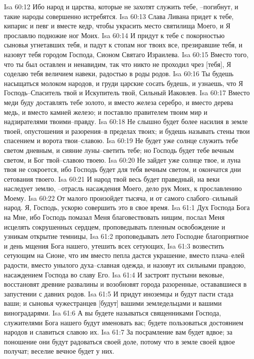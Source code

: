 Isa 60:12  Ибо народ и царства, которые не захотят служить тебе, --погибнут, и такие народы совершенно истребятся.
Isa 60:13  Слава Ливана придет к тебе, кипарис и певг и вместе кедр, чтобы украсить место святилища Моего, и Я прославлю подножие ног Моих.
Isa 60:14  И придут к тебе с покорностью сыновья угнетавших тебя, и падут к стопам ног твоих все, презиравшие тебя, и назовут тебя городом Господа, Сионом Святаго Израилева.
Isa 60:15  Вместо того, что ты был оставлен и ненавидим, так что никто не проходил чрез [тебя], Я соделаю тебя величием навеки, радостью в роды родов.
Isa 60:16  Ты будешь насыщаться молоком народов, и груди царские сосать будешь, и узнаешь, что Я Господь--Спаситель твой и Искупитель твой, Сильный Иаковлев.
Isa 60:17  Вместо меди буду доставлять тебе золото, и вместо железа серебро, и вместо дерева медь, и вместо камней железо; и поставлю правителем твоим мир и надзирателями твоими--правду.
Isa 60:18  Не слышно будет более насилия в земле твоей, опустошения и разорения--в пределах твоих; и будешь называть стены твои спасением и ворота твои--славою.
Isa 60:19  Не будет уже солнце служить тебе светом дневным, и сияние луны--светить тебе; но Господь будет тебе вечным светом, и Бог твой--славою твоею.
Isa 60:20  Не зайдет уже солнце твое, и луна твоя не сокроется, ибо Господь будет для тебя вечным светом, и окончатся дни сетования твоего.
Isa 60:21  И народ твой весь будет праведный, на веки наследует землю, --отрасль насаждения Моего, дело рук Моих, к прославлению Моему.
Isa 60:22  От малого произойдет тысяча, и от самого слабого--сильный народ. Я, Господь, ускорю совершить это в свое время.
Isa 61:1  Дух Господа Бога на Мне, ибо Господь помазал Меня благовествовать нищим, послал Меня исцелять сокрушенных сердцем, проповедывать пленным освобождение и узникам открытие темницы,
Isa 61:2  проповедывать лето Господне благоприятное и день мщения Бога нашего, утешить всех сетующих,
Isa 61:3  возвестить сетующим на Сионе, что им вместо пепла дастся украшение, вместо плача--елей радости, вместо унылого духа--славная одежда, и назовут их сильными правдою, насаждением Господа во славу Его.
Isa 61:4  И застроят пустыни вековые, восстановят древние развалины и возобновят города разоренные, остававшиеся в запустении с давних родов.
Isa 61:5  И придут иноземцы и будут пасти стада ваши; и сыновья чужестранцев [будут] вашими земледельцами и вашими виноградарями.
Isa 61:6  А вы будете называться священниками Господа, служителями Бога нашего будут именовать вас; будете пользоваться достоянием народов и славиться славою их.
Isa 61:7  За посрамление вам будет вдвое; за поношение они будут радоваться своей доле, потому что в земле своей вдвое получат; веселие вечное будет у них.
